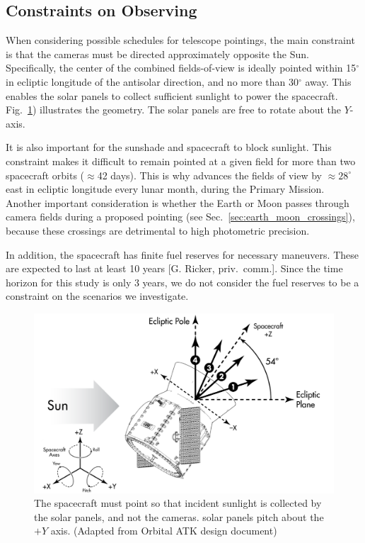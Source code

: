 \subsection{Constraints on \tesss Observing}
\label{sec:constraints_on_pointings}

When considering possible schedules for telescope pointings, the main
constraint is that the cameras must be directed approximately opposite
the Sun.  Specifically, the center of the combined fields-of-view is
ideally pointed within 15$^\circ$ in ecliptic longitude of the antisolar 
direction, and no more than 30$^\circ$ away.
This enables the solar panels to collect
sufficient sunlight to power the spacecraft.
Fig.~\ref{fig:spacecraft_angles}) illustrates the geometry. The solar
panels are free to rotate about the $Y$-axis.

It is also important for the sunshade and 
spacecraft to block sunlight.
This constraint makes it difficult to remain pointed at a given field for more than two spacecraft orbits ($\approx$42 days). This is why \tess advances the fields of view by $\approx$$28^\circ$ east in ecliptic
longitude every lunar month, during the Primary Mission.  Another important consideration
is whether the Earth or Moon passes
through \tesss camera fields during a proposed pointing (see
Sec.~\ref{sec:earth_moon_crossings}), because these crossings are detrimental to high photometric precision.

In addition, the spacecraft has finite fuel reserves for necessary maneuvers.
These are expected to last at least 10 years [G. Ricker, priv.\ comm.].
Since the time horizon for this study is only 3 years, 
we do not consider the fuel reserves to be a constraint on the scenarios
we investigate.

\begin{figure}[!b]
	\centering
	\includegraphics{figures/spacecraft_angles_corr.pdf}
	\caption{The spacecraft must point so that incident sunlight is collected 
		by the solar panels, and not the cameras. \tesss solar panels pitch 
		about the $+Y$ axis. (Adapted from Orbital ATK design document) }
	\label{fig:spacecraft_angles}
\end{figure}
